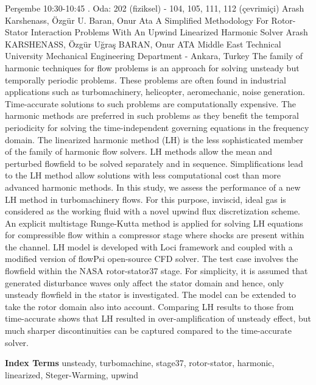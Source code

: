 
    \begin{abstract_basarim}
    {Perşembe 10:30-10:45}
    {.}
    {Oda: 202 (fiziksel) - 104, 105, 111, 112 (çevrimiçi)}
    {Arash Karshenass, Özgür U. Baran, Onur Ata}
    {A Simplified Methodology For Rotor-Stator Interaction Problems With An Upwind Linearized Harmonic Solver}
    {%
    Arash KARSHENASS, Özgür Uğraş BARAN, Onur ATA}
    {%
    }
    {%
    Middle East Technical University Mechanical Engineering Department - Ankara, Turkey}
    The family of harmonic techniques for flow problems is an approach for solving unsteady but temporally periodic problems. These problems are often found in industrial applications such as turbomachinery, helicopter, aeromechanic, noise generation. Time-accurate solutions to such problems are computationally expensive. The harmonic methods are preferred in such problems as they benefit the temporal periodicity for solving the time-independent governing equations in the frequency domain. The linearized harmonic method (LH) is the less sophisticated member of the family of harmonic flow solvers. LH methods allow the mean and perturbed flowfield to be solved separately and in sequence. Simplifications lead to the LH method allow solutions with less computational cost than more advanced harmonic methods. In this study, we assess the performance of a new LH method in turbomachinery flows. For this purpose, inviscid, ideal gas is considered as the working fluid with a novel upwind flux discretization scheme. An explicit multistage Runge-Kutta method is applied for solving LH equations for compressible flow within a compressor stage where shocks are present within the channel. LH model is developed with Loci framework and coupled with a modified version of flowPsi open-source CFD solver. The test case involves the flowfield within the NASA rotor-stator37 stage. For simplicity, it is assumed that generated disturbance waves only affect the stator domain and hence, only unsteady flowfield in the stator is investigated. The model can be extended to take the rotor domain also into account. Comparing LH results to those from time-accurate shows that LH resulted in over-amplification of unsteady effect, but much sharper discontinuities can be captured compared to the time-accurate solver. 
    
            \textbf{Index Terms} \newline{}unsteady, turbomachine, stage37, rotor-stator, harmonic, linearized, Steger-Warming, upwind
    \end{abstract_basarim}
    
